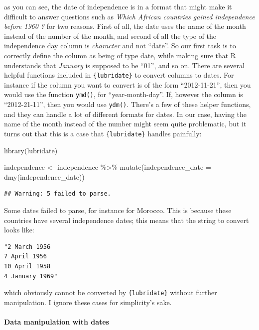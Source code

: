\documentclass[
]{article}
\newenvironment{Shaded}{\begin{snugshade}}{\end{snugshade}}
\newcommand{\AttributeTok}[1]{\textcolor[rgb]{0.77,0.63,0.00}{#1}}
\newcommand{\FunctionTok}[1]{\textcolor[rgb]{0.00,0.00,0.00}{#1}}
\newcommand{\NormalTok}[1]{#1}
\newcommand{\OtherTok}[1]{\textcolor[rgb]{0.56,0.35,0.01}{#1}}
\newcommand{\SpecialCharTok}[1]{\textcolor[rgb]{0.00,0.00,0.00}{#1}}
\begin{document}
as you can see, the date of independence is in a format that might make it difficult to answer questions
such as \emph{Which African countries gained independence before 1960 ?} for two reasons. First of all,
the date uses the name of the month instead of the number of the month, and second of all the type of
the independence day column is \emph{character} and not ``date''. So our first task is to correctly define the column
as being of type date, while making sure that R understands that \emph{January} is supposed to be ``01'', and so
on. There are several helpful functions included in \texttt{\{lubridate\}} to convert columns to dates. For instance
if the column you want to convert is of the form ``2012-11-21'', then you would use the function \texttt{ymd()},
for ``year-month-day''. If, however the column is ``2012-21-11'', then you would use \texttt{ydm()}. There's
a few of these helper functions, and they can handle a lot of different formats for dates. In our case,
having the name of the month instead of the number might seem quite problematic, but it turns out
that this is a case that \texttt{\{lubridate\}} handles painfully:

\begin{Shaded}
\begin{Highlighting}[]
\FunctionTok{library}\NormalTok{(lubridate)}

\NormalTok{independence }\OtherTok{\textless{}{-}}\NormalTok{ independence }\SpecialCharTok{\%\textgreater{}\%}
  \FunctionTok{mutate}\NormalTok{(}\AttributeTok{independence\_date =} \FunctionTok{dmy}\NormalTok{(independence\_date))}
\end{Highlighting}
\end{Shaded}

\begin{verbatim}
## Warning: 5 failed to parse.
\end{verbatim}

Some dates failed to parse, for instance for Morocco. This is because these countries have several
independence dates; this means that the string to convert looks like:

\begin{verbatim}
"2 March 1956
7 April 1956
10 April 1958
4 January 1969"
\end{verbatim}

which obviously cannot be converted by \texttt{\{lubridate\}} without further manipulation. I ignore these cases for
simplicity's sake.

\hypertarget{data-manipulation-with-dates}{%
\paragraph{Data manipulation with dates}\label{data-manipulation-with-dates}}
\end{document}
